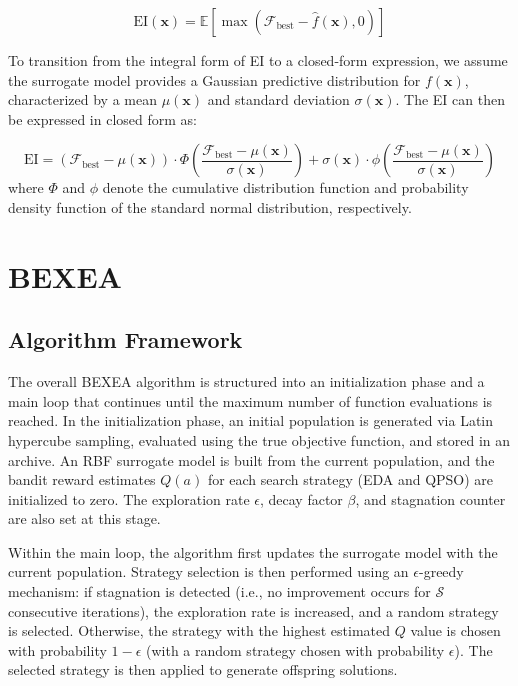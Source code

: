 \documentclass[review]{elsarticle}
\begin{document}
\begin{equation}
    \text{EI}(\boldsymbol{x}) = \mathbb{E}[\max(\mathcal{F}_\text{best} - \hat{f}(\boldsymbol{x}), 0)]
\end{equation}

To transition from the integral form of EI to a closed-form expression, we assume the surrogate model provides a Gaussian predictive distribution for $f(\boldsymbol{x})$, characterized by a mean $\mu(\boldsymbol{x})$ and standard deviation $\sigma(\boldsymbol{x})$. The EI can then be expressed in closed form as:

\begin{equation}
    \text{EI} = (\mathcal{F}_\text{best} - \mu(\boldsymbol{x})) \cdot \Phi \left( \frac{\mathcal{F}_\text{best} - \mu(\boldsymbol{x})}{\sigma(\boldsymbol{x})} \right) + \sigma(\boldsymbol{x}) \cdot \phi \left( \frac{\mathcal{F}_\text{best} - \mu(\boldsymbol{x})}{\sigma(\boldsymbol{x})} \right)
\end{equation}
where $\Phi$ and $\phi$ denote the cumulative distribution function and probability density function of the standard normal distribution, respectively.

\section{BEXEA}
\subsection{Algorithm Framework}

The overall BEXEA algorithm is structured into an initialization phase and a main loop that continues until the maximum number of function evaluations is reached. In the initialization phase, an initial population is generated via Latin hypercube sampling, evaluated using the true objective function, and stored in an archive. An RBF surrogate model is built from the current population, and the bandit reward estimates $Q(a)$ for each search strategy (EDA and QPSO) are initialized to zero. The exploration rate $\epsilon$, decay factor $\beta$, and stagnation counter are also set at this stage.

Within the main loop, the algorithm first updates the surrogate model with the current population. Strategy selection is then performed using an $\epsilon$-greedy mechanism: if stagnation is detected (i.e., no improvement occurs for $\mathcal{S}$ consecutive iterations), the exploration rate is increased, and a random strategy is selected. Otherwise, the strategy with the highest estimated $Q$ value is chosen with probability $1-\epsilon$ (with a random strategy chosen with probability $\epsilon$). The selected strategy is then applied to generate offspring solutions.
\end{document}
